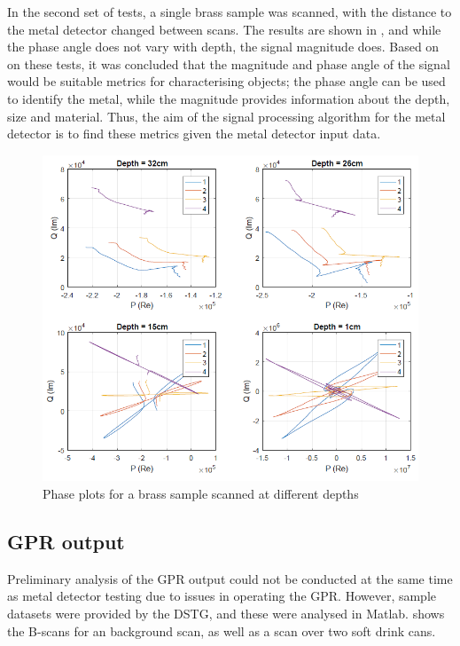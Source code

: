 \documentclass[main.tex]{subfiles}
\begin{document}
In the second set of tests, a single brass sample was scanned, with the distance to the metal detector changed between scans. The results are shown in , and while the phase angle does not vary with depth, the signal magnitude does. Based on on these tests,   it was concluded that the magnitude and phase angle of the signal would be suitable metrics for characterising objects; the phase angle can be used to identify the metal, while the magnitude provides information about the depth, size and material. Thus, the aim of the signal processing algorithm for the metal detector is to find these metrics given the metal detector input data. 

\begin{figure}[ht]
\includegraphics[width=\textwidth]{3-ConceptDesign/phaseDepth.PNG}
\centering
\caption{Phase plots for a brass sample scanned at different depths} 
\end{figure}

\subsection{GPR output}
Preliminary analysis of the GPR output could not be conducted at the same time as metal detector testing due to issues in operating the GPR. However, sample datasets were provided by the DSTG, and these were analysed in Matlab.  shows the B-scans for an background scan, as well as a scan over two soft drink cans. 
\end{document}
